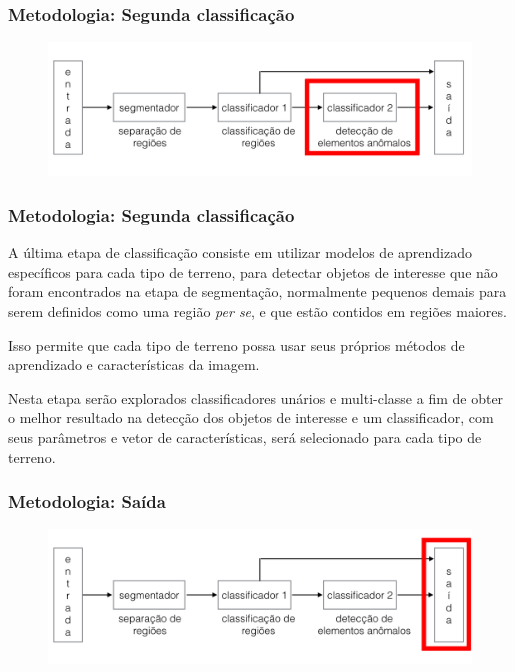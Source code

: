\documentclass[t]{beamer}
\begin{document}
\begin{frame}[c]
	\frametitle{Metodologia: Segunda classificação}
	\begin{figure}[h]
    	\includegraphics[width=\textwidth]{imgs/arquitetura_3}
	\end{figure}
\end{frame}

\begin{frame}
	\frametitle{Metodologia: Segunda classificação}

	A última etapa de classificação consiste em utilizar modelos de aprendizado específicos para cada tipo de terreno, para detectar objetos de interesse que não foram encontrados na etapa de segmentação, normalmente pequenos demais para serem definidos como uma região \textit{per se}, e que estão contidos em regiões maiores.

	\vspace{0.5cm} 

	Isso permite que cada tipo de terreno possa usar seus próprios métodos de aprendizado e características da imagem.

	\vspace{0.5cm}

	Nesta etapa serão explorados classificadores unários e multi-classe a fim de obter o melhor resultado na detecção dos objetos de interesse e um classificador, com seus parâmetros e vetor de características, será selecionado para cada tipo de terreno.
\end{frame}

\begin{frame}[c]
	\frametitle{Metodologia: Saída}
	\begin{figure}[h]
    	\includegraphics[width=\textwidth]{imgs/arquitetura_4}
	\end{figure}
\end{frame}
\end{document}
